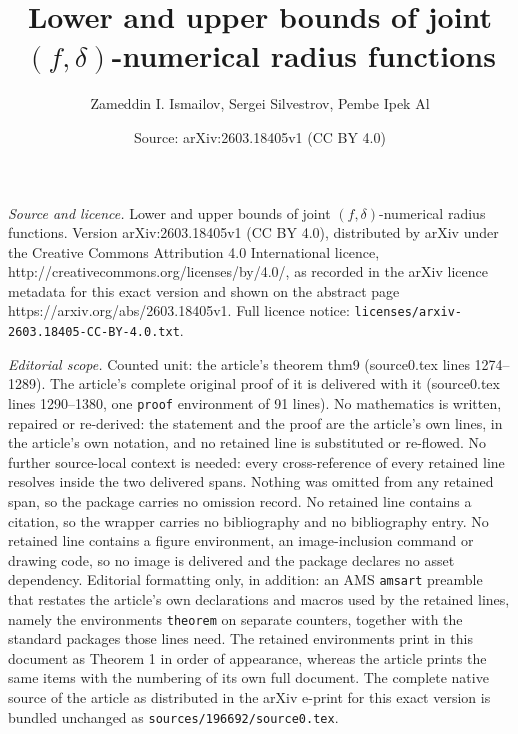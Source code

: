 \documentclass[10pt,a4paper]{amsart}
\title{Lower and upper bounds of joint $(f,\delta)$-numerical radius functions}
\author{Zameddin I. Ismailov, Sergei Silvestrov, Pembe Ipek Al}
\date{Source: arXiv:2603.18405v1 (CC BY 4.0)}
\begin{document}
\maketitle

\noindent\emph{Source and licence.} Lower and upper bounds of joint $(f,\delta)$-numerical radius functions. Version arXiv:2603.18405v1 (CC BY 4.0), distributed by arXiv under the Creative Commons Attribution 4.0 International licence, http://creativecommons.org/licenses/by/4.0/, as recorded in the arXiv licence metadata for this exact version and shown on the abstract page https://arxiv.org/abs/2603.18405v1. Full licence notice: \texttt{licenses/arxiv-2603.18405-CC-BY-4.0.txt}.\par\smallskip

\noindent\textit{Editorial scope.} Counted unit: the article's theorem thm9 (source0.tex lines 1274--1289). The article's complete original proof of it is delivered with it (source0.tex lines 1290--1380, one \texttt{proof} environment of 91 lines). No mathematics is written, repaired or re-derived: the statement and the proof are the article's own lines, in the article's own notation, and no retained line is substituted or re-flowed.  No further source-local context is needed: every cross-reference of every retained line resolves inside the two delivered spans.  Nothing was omitted from any retained span, so the package carries no omission record.  No retained line contains a citation, so the wrapper carries no bibliography and no bibliography entry.  No retained line contains a figure environment, an image-inclusion command or drawing code, so no image is delivered and the package declares no asset dependency.  Editorial formatting only, in addition: an AMS \texttt{amsart} preamble that restates the article's own declarations and macros used by the retained lines, namely the environments \texttt{theorem} on separate counters, together with the standard packages those lines need.  The retained environments print in this document as Theorem 1 in order of appearance, whereas the article prints the same items with the numbering of its own full document.  The complete native source of the article as distributed in the arXiv e-print for this exact version is bundled unchanged as \texttt{sources/196692/source0.tex}.
\end{document}
